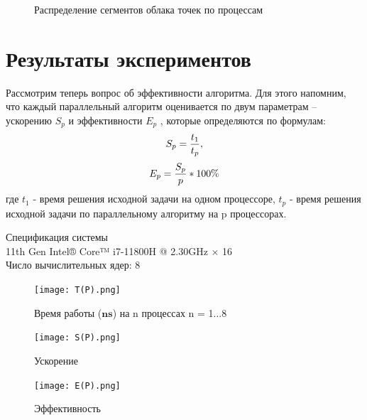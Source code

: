 \begin{figure}
  \centering
  \caption{Распределение сегментов облака точек по процессам}
\end{figure}


\section{Результаты экспериментов}

Рассмотрим теперь вопрос об эффективности алгоритма. Для этого напомним, что
каждый параллельный алгоритм оценивается по двум параметрам – ускорению $S_p$ и
эффективности $E_p$ , которые определяются по формулам:
$$S_p = {{t_1} \over {t_p}},$$ $$E_p = {S_p \over p} * 100\%$$
где $t_1$ - время решения исходной задачи на одном процессоре, $t_p$ - время
решения исходной задачи по параллельному алгоритму на p процессорах.

Спецификация системы \\
11th Gen Intel® Core™ i7-11800H @ 2.30GHz × 16  \\ 
Число вычислительных ядер: 8


\begin{figure}[h]
    \centering
    \texttt{[image: T(P).png]}
    \caption{Время работы ($\mathbf{ns}$) на n процессах n = 1...8}
    \label{fig:mesh1}
\end{figure}

\begin{figure}[h]
    \centering
    \texttt{[image: S(P).png]}
    \caption{Ускорение}
    \label{fig:mesh1}
\end{figure}

\begin{figure}[h]
    \centering
    \texttt{[image: E(P).png]}
    \caption{Эффективность}
    \label{fig:mesh1}
\end{figure}




